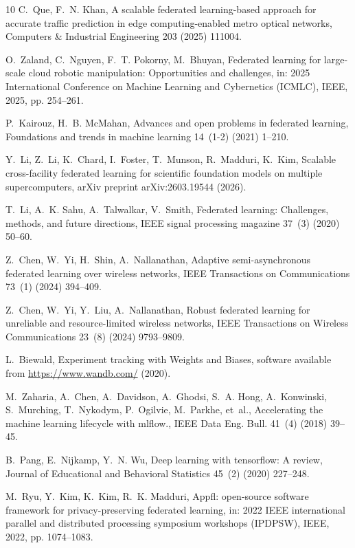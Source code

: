 \documentclass[preprint,12pt, a4paper]{elsarticle}
\begin{document}
\begin{thebibliography}{10}
C.~Que, F.~N. Khan, A scalable federated learning-based approach for accurate traffic prediction in edge computing-enabled metro optical networks, Computers \& Industrial Engineering 203 (2025) 111004.

O.~Zaland, C.~Nguyen, F.~T. Pokorny, M.~Bhuyan, Federated learning for large-scale cloud robotic manipulation: Opportunities and challenges, in: 2025 International Conference on Machine Learning and Cybernetics (ICMLC), IEEE, 2025, pp. 254--261.

P.~Kairouz, H.~B. McMahan, Advances and open problems in federated learning, Foundations and trends in machine learning 14~(1-2) (2021) 1--210.

Y.~Li, Z.~Li, K.~Chard, I.~Foster, T.~Munson, R.~Madduri, K.~Kim, Scalable cross-facility federated learning for scientific foundation models on multiple supercomputers, arXiv preprint arXiv:2603.19544 (2026).

T.~Li, A.~K. Sahu, A.~Talwalkar, V.~Smith, Federated learning: Challenges, methods, and future directions, IEEE signal processing magazine 37~(3) (2020) 50--60.

Z.~Chen, W.~Yi, H.~Shin, A.~Nallanathan, Adaptive semi-asynchronous federated learning over wireless networks, IEEE Transactions on Communications 73~(1) (2024) 394--409.

Z.~Chen, W.~Yi, Y.~Liu, A.~Nallanathan, Robust federated learning for unreliable and resource-limited wireless networks, IEEE Transactions on Wireless Communications 23~(8) (2024) 9793--9809.

L.~Biewald, Experiment tracking with {Weights and Biases}, software available from \url{https://www.wandb.com/} (2020).

M.~Zaharia, A.~Chen, A.~Davidson, A.~Ghodsi, S.~A. Hong, A.~Konwinski, S.~Murching, T.~Nykodym, P.~Ogilvie, M.~Parkhe, et~al., Accelerating the machine learning lifecycle with mlflow., IEEE Data Eng. Bull. 41~(4) (2018) 39--45.

B.~Pang, E.~Nijkamp, Y.~N. Wu, Deep learning with tensorflow: A review, Journal of Educational and Behavioral Statistics 45~(2) (2020) 227--248.

M.~Ryu, Y.~Kim, K.~Kim, R.~K. Madduri, Appfl: open-source software framework for privacy-preserving federated learning, in: 2022 IEEE international parallel and distributed processing symposium workshops (IPDPSW), IEEE, 2022, pp. 1074--1083.


\end{thebibliography}
\end{document}
